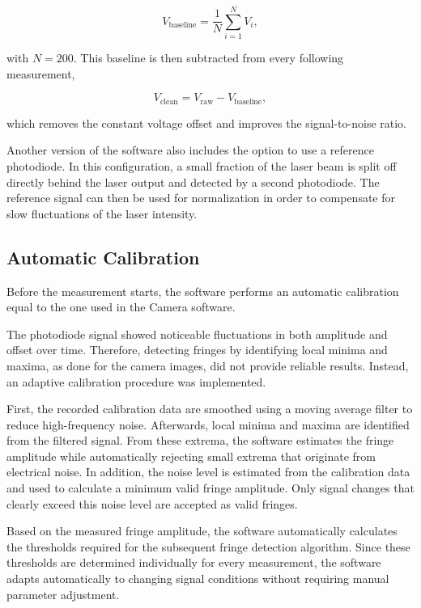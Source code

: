 \begin{equation}
V_\mathrm{baseline}=\frac{1}{N}\sum_{i=1}^{N}V_i,
\end{equation}

with $N=200$. This baseline is then subtracted from every following measurement,

\begin{equation}
V_\mathrm{clean}=V_\mathrm{raw}-V_\mathrm{baseline},
\end{equation}

which removes the constant voltage offset and improves the signal-to-noise ratio.

Another version of the software also includes the option to use a reference photodiode. In this configuration, a small fraction of the laser beam is split off directly behind the laser output and detected by a second photodiode. The reference signal can then be used for normalization in order to compensate for slow fluctuations of the laser intensity. 

\subsection{Automatic Calibration}

Before the measurement starts, the software performs an automatic calibration equal to the one used in the Camera software. 

The photodiode signal showed noticeable fluctuations in both amplitude and offset over time. Therefore, detecting fringes by identifying local minima and maxima, as done for the camera images, did not provide reliable results. Instead, an adaptive calibration procedure was implemented.

First, the recorded calibration data are smoothed using a moving average filter to reduce high-frequency noise. Afterwards, local minima and maxima are identified from the filtered signal. From these extrema, the software estimates the fringe amplitude while automatically rejecting small extrema that originate from electrical noise. In addition, the noise level is estimated from the calibration data and used to calculate a minimum valid fringe amplitude. Only signal changes that clearly exceed this noise level are accepted as valid fringes.

Based on the measured fringe amplitude, the software automatically calculates the thresholds required for the subsequent fringe detection algorithm. Since these thresholds are determined individually for every measurement, the software adapts automatically to changing signal conditions without requiring manual parameter adjustment.

